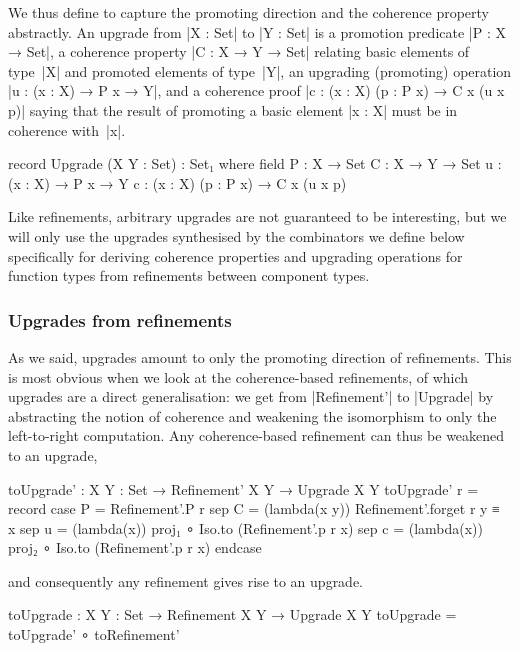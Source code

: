 We thus define  to capture the promoting direction and the coherence property abstractly.
An upgrade from |X : Set| to |Y : Set| is a promotion predicate |P : X → Set|, a coherence property |C : X → Y → Set| relating basic elements of type~|X| and promoted elements of type~|Y|, an upgrading (promoting) operation |u : (x : X) → P x → Y|, and a coherence proof |c : (x : X) (p : P x) → C x (u x p)| saying that the result of promoting a basic element |x : X| must be in coherence with~|x|.
\begin{code}
record Upgrade (X Y : Set) : Set₁ where
  field
    P  :  X → Set
    C  :  X → Y → Set
    u  :  (x : X) → P x → Y
    c  :  (x : X) (p : P x) → C x (u x p)
\end{code}
Like refinements, arbitrary upgrades are not guaranteed to be interesting, but we will only use the upgrades synthesised by the combinators we define below specifically for deriving coherence properties and upgrading operations for function types from refinements between component types.

\subsubsection{Upgrades from refinements}

As we said, upgrades amount to only the promoting direction of refinements.
This is most obvious when we look at the coherence-based refinements, of which upgrades are a direct generalisation: we get from |Refinement'| to |Upgrade| by abstracting the notion of coherence and weakening the isomorphism to only the left-to-right computation.
Any coherence-based refinement can thus be weakened to an upgrade,
\begin{code}
toUpgrade' : {X Y : Set} → Refinement' X Y → Upgrade X Y
toUpgrade' r = record  case  P  =  Refinement'.P r
                       sep   C  =  (lambda(x y)) Refinement'.forget r y ≡ x
                       sep   u  =  (lambda(x)) proj₁  ∘ Iso.to (Refinement'.p r x)
                       sep   c  =  (lambda(x)) proj₂  ∘ Iso.to (Refinement'.p r x) endcase
\end{code}
and consequently any refinement gives rise to an upgrade.
\begin{code}
toUpgrade : {X Y : Set} → Refinement X Y → Upgrade X Y
toUpgrade = toUpgrade' ∘ toRefinement'
\end{code}


